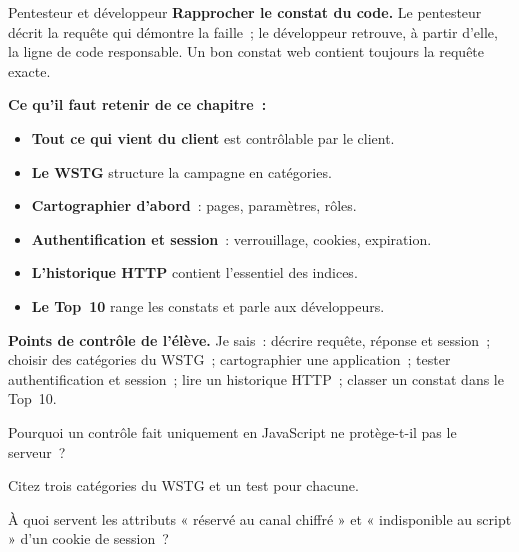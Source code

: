 \begin{boxmetier}{Pentesteur et développeur}
\textbf{Rapprocher le constat du code.} Le pentesteur décrit la requête qui
démontre la faille~; le développeur retrouve, à partir d'elle, la ligne de
code responsable. Un bon constat web contient toujours la requête exacte.
\end{boxmetier}

\separateur

\begin{boxresume}
\textbf{Ce qu'il faut retenir de ce chapitre~:}
\begin{itemize}
    \item \textbf{Tout ce qui vient du client} est contrôlable par le
          client.
    \item \textbf{Le WSTG} structure la campagne en catégories.
    \item \textbf{Cartographier d'abord}~: pages, paramètres, rôles.
    \item \textbf{Authentification et session}~: verrouillage, cookies,
          expiration.
    \item \textbf{L'historique HTTP} contient l'essentiel des indices.
    \item \textbf{Le Top~10} range les constats et parle aux développeurs.
\end{itemize}
\end{boxresume}

\begin{boxinfo}
\textbf{Points de contrôle de l'élève.} Je sais~: décrire requête, réponse
et session~; choisir des catégories du WSTG~; cartographier une
application~; tester authentification et session~; lire un historique
HTTP~; classer un constat dans le Top~10.
\end{boxinfo}

\bigskip

\begin{boxexo}[title={\ding{45}\quad Exercice~14.1. Confiance au client \niveaubase}]
Pourquoi un contrôle fait uniquement en JavaScript ne protège-t-il pas le
serveur~?
\end{boxexo}

\begin{boxexo}[title={\ding{45}\quad Exercice~14.2. Catégories \niveaubase}]
Citez trois catégories du WSTG et un test pour chacune.
\end{boxexo}

\begin{boxexo}[title={\ding{45}\quad Exercice~14.3. Cookie \niveaubase}]
À quoi servent les attributs « réservé au canal chiffré » et « indisponible
au script » d'un cookie de session~?
\end{boxexo}

